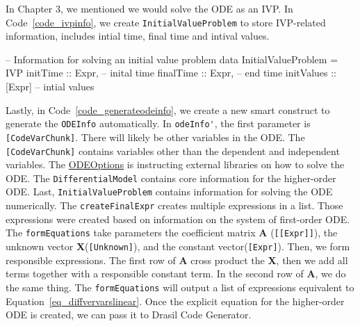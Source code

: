 In Chapter 3, we mentioned we would solve the ODE as an IVP. In Code~\ref{code_ivpinfo}, we create \verb|InitialValueProblem| to store IVP-related information, includes intial time, final time and intival values.
\begin{listing}[ht]
\begin{haskell1}
-- Information for solving an initial value problem
data InitialValueProblem = IVP{
  initTime :: Expr, -- inital time
  finalTime :: Expr, -- end time
  initValues :: [Expr] -- intial values
}
\end{haskell1}
\label{code_ivpinfo}
\end{listing}

Lastly, in Code~\ref{code_generateodeinfo}, we create a new smart construct to generate the \verb|ODEInfo| automatically. In \verb|odeInfo'|, the first parameter is \verb|[CodeVarChunk]|. There will likely be other variables in the ODE. The \verb|[CodeVarChunk]| contains variables other than the dependent and independent variables. The \href{https://jacquescarette.github.io/Drasil/docs/full/drasil-code-0.1.9.0/Language-Drasil-Data-ODEInfo.html#t:ODEOptions}{ODEOptions} is instructing external libraries on how to solve the ODE. The \verb|DifferentialModel| contains core information for the higher-order ODE. Last, \verb|InitialValueProblem| contains information for solving the ODE numerically. The \verb|createFinalExpr| creates multiple expressions in a list. Those expressions were created based on information on the system of first-order ODE. The \verb|formEquations| take parameters the coefficient matrix \textbf{A} (\verb|[[Expr]]|), the unknown vector \textbf{X}(\verb|[Unknown]|), and the constant vector(\verb|[Expr]|). Then, we form responsible expressions. The first row of \textbf{A} cross product the \textbf{X}, then we add all terms together with a responsible constant term. In the second row of \textbf{A}, we do the same thing. The \verb|formEquations| will output a list of expressions equivalent to Equation~\ref{eq_diffvervarslinear}. Once the explicit equation for the higher-order ODE is created, we can pass it to Drasil Code Generator.

